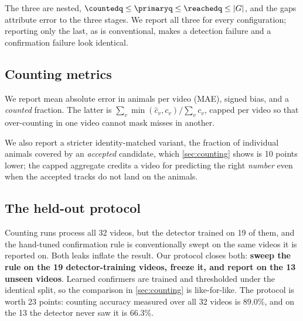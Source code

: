 The three are nested, $\countedq \le \primaryq \le \reachedq \le |G|$, and the gaps
attribute error to the three stages. We report all three for every configuration; reporting
only the last, as is conventional, makes a detection failure and a confirmation failure look
identical.

\subsection{Counting metrics}

We report mean absolute error in animals per video (MAE), signed bias, and a
\emph{counted} fraction. The latter is $\sum_v \min(\hat{c}_v, c_v) / \sum_v c_v$, capped
per video so that over-counting in one video cannot mask misses in another.

We also report a stricter identity-matched variant, the fraction of individual animals
covered by an \emph{accepted} candidate, which \cref{sec:counting} shows is 10 points
lower; the capped aggregate credits a video for predicting the right \emph{number} even
when the accepted tracks do not land on the animals.

\subsection{The held-out protocol}
\label{sec:heldout}

Counting runs process all 32 videos, but the detector trained on 19 of them, and the
hand-tuned confirmation rule is conventionally swept on the same videos it is reported on.
Both leaks inflate the result. Our protocol closes both: \textbf{sweep the rule on the 19
detector-training videos, freeze it, and report on the 13 unseen videos}. Learned
confirmers are trained and thresholded under the identical split, so the comparison in
\cref{sec:counting} is like-for-like. The protocol is worth 23 points: counting accuracy
measured over all 32 videos is 89.0\%, and on the 13 the detector never saw it is 66.3\%.

